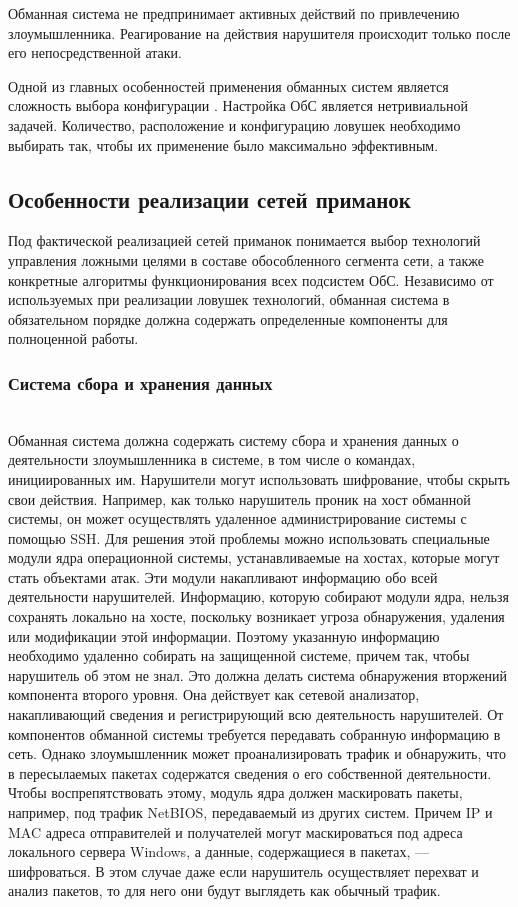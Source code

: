 Обманная система не предпринимает активных действий по привлечению злоумышленника. Реагирование на действия нарушителя происходит только после его непосредственной атаки.

Одной из главных особенностей применения обманных систем является сложность выбора конфигурации \citep{rajan}. Настройка ОбС является нетривиальной задачей. Количество, расположение и конфигурацию ловушек необходимо выбирать так, чтобы их применение было максимально эффективным.

\subsection{Особенности реализации сетей приманок}

Под фактической реализацией сетей приманок понимается выбор технологий управления ложными целями в составе обособленного сегмента сети, а также конкретные алгоритмы функционирования всех подсистем ОбС.  Независимо от используемых при реализации ловушек технологий, обманная система в обязательном порядке должна содержать определенные  компоненты для полноценной работы.

\subsubsection{Система сбора и хранения данных}\hspace*{\fill} \\

Обманная система должна содержать систему сбора и хранения данных о деятельности злоумышленника в системе, в том числе о командах, инициированных им. Нарушители могут использовать шифрование, чтобы скрыть свои действия. Например, как только нарушитель проник на хост обманной системы, он может осуществлять удаленное администрирование системы с помощью SSH. Для решения этой проблемы можно использовать специальные модули ядра операционной системы, устанавливаемые на хостах, которые могут стать объектами атак. Эти модули накапливают информацию обо всей деятельности нарушителей. Информацию, которую собирают модули ядра, нельзя сохранять локально на хосте, поскольку возникает угроза обнаружения, удаления или модификации этой информации. Поэтому указанную информацию необходимо удаленно собирать на защищенной системе, причем так, чтобы нарушитель об этом не знал. Это должна делать система обнаружения вторжений компонента второго уровня. Она действует как сетевой анализатор, накапливающий сведения и регистрирующий всю деятельность нарушителей. От компонентов обманной системы требуется передавать собранную информацию в сеть. Однако злоумышленник может проанализировать трафик и обнаружить, что в пересылаемых пакетах содержатся сведения о его собственной деятельности. Чтобы воспрепятствовать этому, модуль ядра должен маскировать пакеты, например, под трафик NetBIOS, передаваемый из других систем. Причем IP и MAC адреса отправителей и получателей могут маскироваться под адреса локального сервера Windows, а данные, содержащиеся в пакетах, — шифроваться. В этом случае даже если нарушитель осуществляет перехват и анализ пакетов, то для него они будут выглядеть как обычный трафик.

